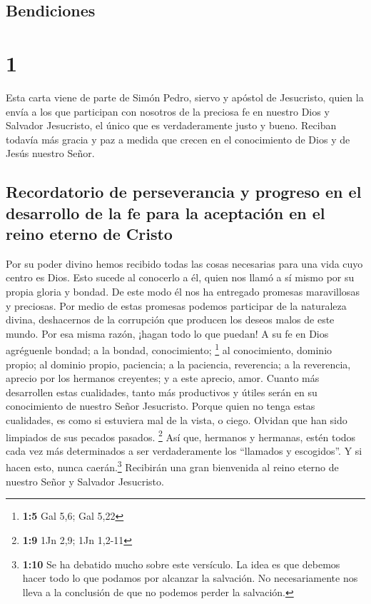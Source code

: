 \hypertarget{bendiciones}{%
\subsection{Bendiciones}\label{bendiciones}}

\hypertarget{section}{%
\section{1}\label{section}}

 Esta carta viene de parte de Simón Pedro, siervo y
apóstol de Jesucristo, quien la envía a los que participan con nosotros
de la preciosa fe en nuestro Dios y Salvador Jesucristo, el único que es
verdaderamente justo y bueno.  Reciban todavía más gracia
y paz a medida que crecen en el conocimiento de Dios y de Jesús nuestro
Señor.

\hypertarget{recordatorio-de-perseverancia-y-progreso-en-el-desarrollo-de-la-fe-para-la-aceptaciuxf3n-en-el-reino-eterno-de-cristo}{%
\subsection{Recordatorio de perseverancia y progreso en el desarrollo de
la fe para la aceptación en el reino eterno de
Cristo}\label{recordatorio-de-perseverancia-y-progreso-en-el-desarrollo-de-la-fe-para-la-aceptaciuxf3n-en-el-reino-eterno-de-cristo}}

 Por su poder divino hemos recibido todas las cosas
necesarias para una vida cuyo centro es Dios. Esto sucede al conocerlo a
él, quien nos llamó a sí mismo por su propia gloria y bondad. De este
modo él nos ha entregado promesas maravillosas y preciosas.
 Por medio de estas promesas podemos participar de la
naturaleza divina, deshacernos de la corrupción que producen los deseos
malos de este mundo.  Por esa misma razón, ¡hagan todo lo
que puedan! A su fe en Dios agréguenle bondad; a la bondad,
conocimiento; \footnote{\textbf{1:5} Gal 5,6; Gal 5,22} 
al conocimiento, dominio propio; al dominio propio, paciencia; a la
paciencia, reverencia;  a la reverencia, aprecio por los
hermanos creyentes; y a este aprecio, amor.  Cuanto más
desarrollen estas cualidades, tanto más productivos y útiles serán en su
conocimiento de nuestro Señor Jesucristo.  Porque quien no
tenga estas cualidades, es como si estuviera mal de la vista, o ciego.
Olvidan que han sido limpiados de sus pecados pasados. \footnote{\textbf{1:9}
  1Jn 2,9; 1Jn 1,2-11}  Así que, hermanos y hermanas,
estén todos cada vez más determinados a ser verdaderamente los
``llamados y escogidos''. Y si hacen esto, nunca caerán.\footnote{\textbf{1:10}
  Se ha debatido mucho sobre este versículo. La idea es que debemos
  hacer todo lo que podamos por alcanzar la salvación. No necesariamente
  nos lleva a la conclusión de que no podemos perder la salvación.}
 Recibirán una gran bienvenida al reino eterno de nuestro
Señor y Salvador Jesucristo.

